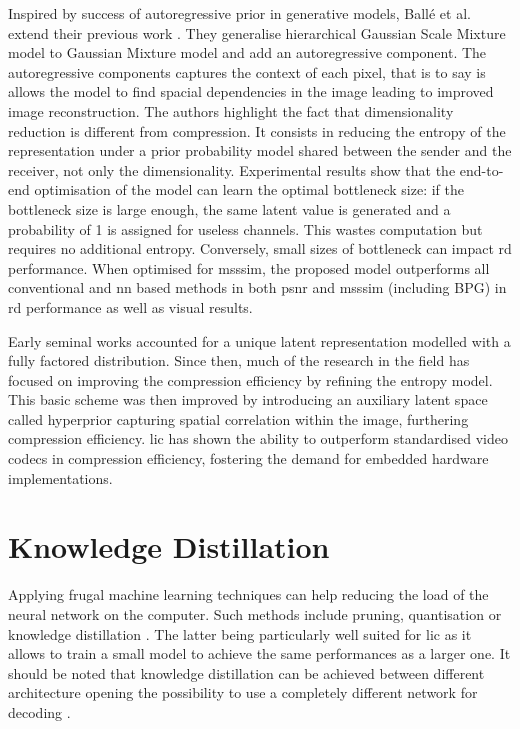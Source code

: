Inspired by success of autoregressive prior in generative models, Ballé et al. extend their previous work \cite{minnen2018jointautoregressivehierarchicalpriors}. They generalise hierarchical Gaussian Scale Mixture model to Gaussian Mixture model and add an autoregressive component. The autoregressive components captures the context of each pixel, that is to say is allows the model to find spacial dependencies in the image leading to improved image reconstruction. The authors highlight the fact that dimensionality reduction is different from compression. It consists in reducing the entropy of the representation under a prior probability model shared between the sender and the receiver, not only the dimensionality. Experimental results show that the end-to-end optimisation of the model can learn the optimal bottleneck size: if the bottleneck size is large enough, the same latent value is generated and a probability of 1 is assigned for useless channels. This wastes computation but requires no additional entropy. Conversely, small sizes of bottleneck can impact \acrshort{rd} performance. When optimised for \acrshort{msssim}, the proposed model outperforms all conventional and \acrshort{nn} based methods in both \acrshort{psnr} and \acrshort{msssim} (including BPG) in \acrshort{rd} performance as well as visual results.

Early seminal works accounted for a unique latent representation modelled with a fully factored distribution. Since then, much of the research in the field has focused on improving the compression efficiency by refining the entropy model. This basic scheme was then improved by introducing an auxiliary latent space called hyperprior capturing spatial correlation within the image, furthering compression efficiency. \acrshort{lic} has shown the ability to outperform standardised video codecs in compression efficiency, fostering the demand for embedded hardware implementations.

\section{Knowledge Distillation}
Applying frugal machine learning techniques can help reducing the load of the neural network on the computer. Such methods include pruning, quantisation or knowledge distillation \cite{touvron2021trainingdataefficientimagetransformers}. The latter being particularly well suited for \acrshort{lic} as it allows to train a small model to achieve the same performances as a larger one. It should be noted that knowledge distillation can be achieved between different architecture opening the possibility to use a completely different network for decoding \cite{liu2022crossarchitectureknowledgedistillation}.

